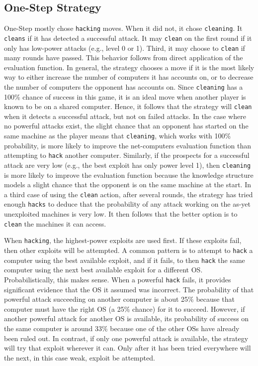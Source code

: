 \documentclass{sig-alternate-05-2015}
\begin{document}
\subsection{One-Step Strategy}
One-Step mostly chose {\tt hacking} moves.
When it did not, it chose {\tt cleaning}.
It {\tt cleans} if it has detected a successful attack.
It may {\tt clean} on the first round if it only has low-power attacks (e.g., level 0 or 1).
Third, it may choose to {\tt clean} if many rounds have passed.
This behavior follows from direct application of the evaluation function.
In general, the strategy chooses a move if it is the most likely way to either increase the number of computers it has accounts on, or to decrease the number of computers the opponent has accounts on. Since {\tt cleaning} has a 100\% chance of success in this game, it is an ideal move when another player is known to be on a shared computer. 
Hence, it follows that the strategy will {\tt clean} when it detects a successful attack, but not on failed attacks. 
In the case where no powerful attacks exist, the slight chance that an opponent has started on the same machine as the player means that {\tt cleaning}, which works with 100\% probability, is more likely to improve the net-computers evaluation function than attempting to {\tt hack} another computer.
Similarly, if the prospects for a successful attack are very low (e.g., the best exploit has only power level 1), then {\tt cleaning} is more likely to improve the evaluation function because the knowledge structure models a slight chance that the opponent is on the same machine at the start.
In a third case of using the {\tt clean} action, after several rounds, the strategy has tried enough {\tt hacks} to deduce that the probability of any attack working on the as-yet unexploited machines is very low.
It then follows that the better option is to {\tt clean} the machines it can access.

When {\tt hacking}, the highest-power exploits are used first.
If these exploits fail, then other exploits will be attempted.
A common pattern is to attempt to {\tt hack} a computer using the best available exploit, and if it fails, to then {\tt hack} the same computer using the next best available exploit for a different OS.
Probabilistically, this makes sense. 
When a powerful {\tt hack} fails, it provides significant evidence that the OS it assumed was incorrect.
The probability of that powerful attack succeeding on another computer is about 25\% because that computer must have the right OS (a 25\% chance) for it to succeed.
However, if another powerful attack for another OS is available, its probability of success on the same computer is around 33\% because one of the other OSs have already been ruled out.
In contrast, if only one powerful attack is available, the strategy will try that exploit wherever it can.
Only after it has been tried everywhere will the next, in this case weak, exploit be attempted.
\end{document}
